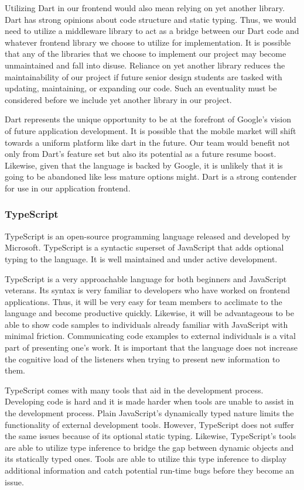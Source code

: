 \documentclass[12pt]{report}
\begin{document}
Utilizing Dart in our frontend would also mean relying on yet another library. Dart has strong opinions about code structure and static typing. Thus, we would need to utilize a middleware library to act as a bridge between our Dart code and whatever frontend library we choose to utilize for implementation. It is possible that any of the libraries that we choose to implement our project may become unmaintained and fall into disuse. Reliance on yet another library reduces the maintainability of our project if future senior design students are tasked with updating, maintaining, or expanding our code. Such an eventuality must be considered before we include yet another library in our project.

Dart represents the unique opportunity to be at the forefront of Google's vision of future application development. It is possible that the mobile market will shift towards a uniform platform like dart in the future. Our team would benefit not only from Dart's feature set but also its potential as a future resume boost. Likewise, given that the language is backed by Google, it is unlikely that it is going to be abandoned like less mature options might. Dart is a strong contender for use in our application frontend.

\subsubsection*{TypeScript}

TypeScript is an open-source programming language released and developed by Microsoft. TypeScript is a syntactic superset of JavaScript that adds optional typing to the language.\cite{typescripthomepage} It is well maintained and under active development.

TypeScript is a very approachable language for both beginners and JavaScript veterans. Its syntax is very familiar to developers who have worked on frontend applications. Thus, it will be very easy for team members to acclimate to the language and become productive quickly. Likewise, it will be advantageous to be able to show code samples to individuals already familiar with JavaScript with minimal friction. Communicating code examples to external individuals is a vital part of presenting one's work. It is important that the language does not increase the cognitive load of the listeners when trying to present new information to them.

TypeScript comes with many tools that aid in the development process. Developing code is hard and it is made harder when tools are unable to assist in the development process. Plain JavaScript's dynamically typed nature limits the functionality of external development tools. However, TypeScript does not suffer the same issues because of its optional static typing. Likewise, TypeScript's tools are able to utilize type inference to bridge the gap between dynamic objects and its statically typed ones.\cite{typescripthomepage} Tools are able to utilize this type inference to display additional information and catch potential run-time bugs before they become an issue.
\end{document}
